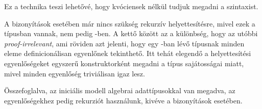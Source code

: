 Ez a technika teszi lehetővé, hogy kvóciensek nélkül tudjuk megadni a szintaxist.

A bizonyítások esetében már nincs szükség rekurzív helyettesítésre, mivel ezek a  típusban vannak, nem pedig -ben. A kettő között az a különbség, hogy az utóbbi \textit{proof-irrelevant}, ami röviden azt jelenti, hogy egy -ban lévő típusnak minden eleme definicionálisan egyenlőnek tekinthető. Itt tehát elegendő a helyettesítési egyenlőségeket egyszerű konstruktorként megadni a  típus sajátosságai miatt, mivel minden egyenlőség triviálisan igaz lesz.

Összefoglalva, az iniciális modell algebrai adattípusokkal van megadva, az egyenlőségekhez pedig rekurziót használunk, kivéve a bizonyítások esetében.

